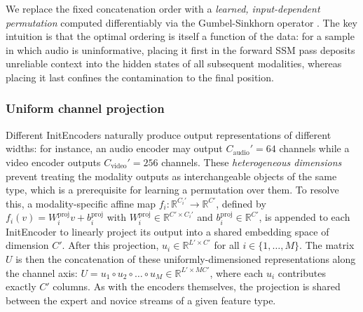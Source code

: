 \documentclass[11pt,a4paper]{article}
\newcommand{\R}{\mathbb{R}}
\begin{document}
	We replace the fixed concatenation order with a \emph{learned, input-dependent permutation} computed differentiably via the Gumbel-Sinkhorn operator \cite{mena2018}. The key intuition is that the optimal ordering is itself a function of the data: for a sample in which audio is uninformative, placing it first in the forward SSM pass deposits unreliable context into the hidden states of all subsequent modalities, whereas placing it last confines the contamination to the final position.
	
	\subsubsection*{Uniform channel projection}
	Different InitEncoders naturally produce output representations of different widths: for instance, an audio encoder may output $C_{\text{audio}}' = 64$ channels while a video encoder outputs $C_{\text{video}}' = 256$ channels. These \emph{heterogeneous dimensions} prevent treating the modality outputs as interchangeable objects of the same type, which is a prerequisite for learning a permutation over them. To resolve this, a modality-specific affine map $f_i : \R^{C_i'} \to \R^{C'}$, defined by $f_i(v) = W_i^{\text{proj}} v + b_i^{\text{proj}}$ with $W_i^{\text{proj}} \in \R^{C' \times C_i'}$ and $b_i^{\text{proj}} \in \R^{C'}$, is appended to each InitEncoder to linearly project its output into a shared embedding space of dimension $C'$. After this projection, $u_i \in \R^{L' \times C'}$ for all $i \in \{1,\dots,M\}$. The matrix $U$ is then the concatenation of these uniformly-dimensioned representations along the channel axis: $U = u_1 \circ u_2 \circ \dots \circ u_M \in \R^{L' \times MC'}$, where each $u_i$ contributes exactly $C'$ columns. As with the encoders themselves, the projection is shared between the expert and novice streams of a given feature type.
	
\end{document}
